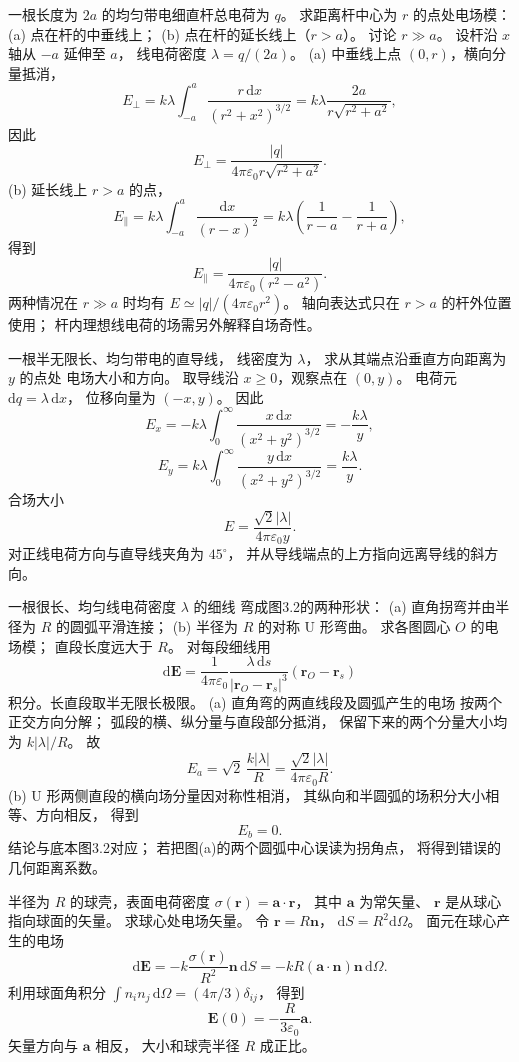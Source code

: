 一根长度为 $2a$ 的均匀带电细直杆总电荷为 $q$。
求距离杆中心为 $r$ 的点处电场模：
(a) 点在杆的中垂线上；
(b) 点在杆的延长线上（$r>a$）。
讨论 $r\gg a$。
\exsolution
设杆沿 $x$ 轴从 $-a$ 延伸至 $a$，
线电荷密度 $\lambda=q/(2a)$。
(a) 中垂线上点 $(0,r)$，横向分量抵消，
\[
E_\perp=k\lambda\int_{-a}^{a}
\frac{r\,\mathrm dx}{(r^2+x^2)^{3/2}}
=k\lambda\frac{2a}{r\sqrt{r^2+a^2}},
\]
因此
\[
\boxed{E_\perp=\frac{|q|}
{4\pi\varepsilon_0r\sqrt{r^2+a^2}}}.
\]
(b) 延长线上 $r>a$ 的点，
\[
E_\parallel=k\lambda\int_{-a}^{a}
\frac{\mathrm dx}{(r-x)^2}
=k\lambda\left(\frac1{r-a}-\frac1{r+a}\right),
\]
得到
\[
\boxed{E_\parallel=\frac{|q|}
{4\pi\varepsilon_0(r^2-a^2)}}.
\]
两种情况在 $r\gg a$ 时均有
$\boxed{E\simeq |q|/(4\pi\varepsilon_0r^2)}$。
\excheck 轴向表达式只在 $r>a$ 的杆外位置使用；
杆内理想线电荷的场需另外解释自场奇性。

一根半无限长、均匀带电的直导线，
线密度为 $\lambda$，
求从其端点沿垂直方向距离为 $y$ 的点处
电场大小和方向。
\exsolution
取导线沿 $x\ge0$，观察点在 $(0,y)$。
电荷元 $\mathrm dq=\lambda\,\mathrm dx$，
位移向量为 $(-x,y)$。
因此
\[
E_x=-k\lambda\int_0^\infty
\frac{x\,\mathrm dx}{(x^2+y^2)^{3/2}}
=-\frac{k\lambda}{y},
\]
\[
E_y=k\lambda\int_0^\infty
\frac{y\,\mathrm dx}{(x^2+y^2)^{3/2}}
=\frac{k\lambda}{y}.
\]
合场大小
\[
\boxed{E=\frac{\sqrt2|\lambda|}
{4\pi\varepsilon_0y}}.
\]
\excheck 对正线电荷方向与直导线夹角为 $45^\circ$，
并从导线端点的上方指向远离导线的斜方向。

一根很长、均匀线电荷密度 $\lambda$ 的细线
弯成图3.2的两种形状：
(a) 直角拐弯并由半径为 $R$ 的圆弧平滑连接；
(b) 半径为 $R$ 的对称 U 形弯曲。
求各图圆心 $O$ 的电场模；
直段长度远大于 $R$。
\exsolution
对每段细线用
\[
\mathrm d\bm E
=\frac{1}{4\pi\varepsilon_0}
\frac{\lambda\,\mathrm ds}{|\bm r_O-\bm r_s|^3}
(\bm r_O-\bm r_s)
\]
积分。长直段取半无限长极限。
(a) 直角弯的两直线段及圆弧产生的电场
按两个正交方向分解；
弧段的横、纵分量与直段部分抵消，
保留下来的两个分量大小均为 $k|\lambda|/R$。
故
\[
\boxed{E_a=\sqrt2\,\frac{k|\lambda|}{R}
=\frac{\sqrt2|\lambda|}{4\pi\varepsilon_0R}}.
\]
(b) U 形两侧直段的横向场分量因对称性相消，
其纵向和半圆弧的场积分大小相等、方向相反，
得到
\[
\boxed{E_b=0}.
\]
\excheck 结论与底本图3.2对应；
若把图(a)的两个圆弧中心误读为拐角点，
将得到错误的几何距离系数。

半径为 $R$ 的球壳，表面电荷密度
$\sigma(\bm r)=\bm a\cdot\bm r$，
其中 $\bm a$ 为常矢量、
$\bm r$ 是从球心指向球面的矢量。
求球心处电场矢量。
\exsolution
令 $\bm r=R\bm n$，
$\mathrm dS=R^2\mathrm d\Omega$。
面元在球心产生的电场
\[
\mathrm d\bm E
=-k\frac{\sigma(\bm r)}{R^2}\bm n\,\mathrm dS
=-kR(\bm a\cdot\bm n)\bm n\,\mathrm d\Omega.
\]
利用球面角积分
$\int n_i n_j\,\mathrm d\Omega
=(4\pi/3)\delta_{ij}$，
得到
\[
\boxed{\bm E(0)=
-\frac{R}{3\varepsilon_0}\bm a}.
\]
\excheck 矢量方向与 $\bm a$ 相反，
大小和球壳半径 $R$ 成正比。

